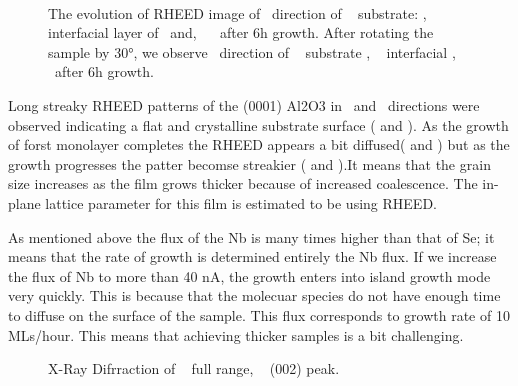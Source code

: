 \begin{figure}
   
    \centering
    \\
    \caption{
        The evolution of RHEED image of \dirx\ direction of 
        \sfA~ substrate:  \alumina, 
        \sfB~  interfacial layer of \nbse\ and,  
        \sfC~  \nbse\ after 6h growth. After rotating the sample by 30°,
         we observe \diry\ direction of 
        \sfD~ substrate ,
        \sfE~ interfacial \nbse ,
        \sfF~ \nbse\ after 6h growth.
    }
\end{figure}
Long streaky RHEED patterns of the (0001) Al2O3 in \dirx\ and \diry\ directions were observed 
indicating a flat and crystalline substrate surface  ( and 
).  As the growth of forst monolayer completes the RHEED appears a 
bit diffused( and ) but as 
the growth progresses the patter becomse streakier ( and 
).It means that the grain size increases as the film grows thicker  
because of increased coalescence. The in-plane lattice parameter for this film 
is estimated to be  using RHEED.

As mentioned above the flux of the Nb is many times higher than that of Se; it means that
the rate of growth is determined entirely the Nb flux. If we increase the flux of Nb to more
than 40 nA, the growth enters into island growth mode very quickly. This is because that 
the molecuar species do not have enough time to diffuse on the surface of the sample. This
flux corresponds to growth rate of 10 MLs/hour. This means that achieving thicker samples
is a bit challenging.

\begin{figure}
   
    \centering
    \caption{
        X-Ray Difrraction of \nbse
        \sfA~ full range, 
        \sfB~  (002) peak.  
    }
\end{figure}

